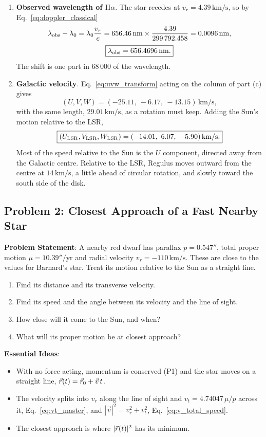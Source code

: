 \begin{enumerate}[label=(\alph*)]
	\item \textbf{Observed wavelength of $\mathrm{H}\alpha$}. The star recedes at $v_r = 4.39\,\mathrm{km/s}$, so by Eq.~\eqref{eq:doppler_classical}
	\[
	\lambda_{\rm obs}-\lambda_0 = \lambda_0\frac{v_r}{c} = 656.46\,\mathrm{nm} \times \frac{4.39}{299\,792.458} = 0.0096\,\mathrm{nm},
	\]
	\[
	\boxed{\lambda_{\rm obs} = 656.4696\,\mathrm{nm}.}
	\]
	The shift is one part in $68\,000$ of the wavelength.

	\item \textbf{Galactic velocity}. Eq.~\eqref{eq:uvw_transform} acting on the column of part (c) gives
	\[
	\boxed{(U,V,W) = (-25.11,\ -6.17,\ -13.15)\,\mathrm{km/s},}
	\]
	with the same length, $29.01\,\mathrm{km/s}$, as a rotation must keep. Adding the Sun's motion relative to the LSR,
	\[
	\boxed{(U_{\rm LSR},V_{\rm LSR},W_{\rm LSR}) = (-14.01,\ 6.07,\ -5.90)\,\mathrm{km/s}.}
	\]
	Most of the speed relative to the Sun is the $U$ component, directed away from the Galactic centre. Relative to the LSR, Regulus moves outward from the centre at $14\,\mathrm{km/s}$, a little ahead of circular rotation, and slowly toward the south side of the disk.
\end{enumerate}

\subsection{Problem 2: Closest Approach of a Fast Nearby Star}
\label{as:prob:closest_approach}

\textbf{Problem Statement}: A nearby red dwarf has parallax $p = 0.547''$, total proper motion $\mu = 10.39''/\mathrm{yr}$ and radial velocity $v_r = -110\,\mathrm{km/s}$. These are close to the values for Barnard's star. Treat its motion relative to the Sun as a straight line.
\begin{enumerate}[label=(\alph*)]
	\item Find its distance and its transverse velocity.
	\item Find its speed and the angle between its velocity and the line of sight.
	\item How close will it come to the Sun, and when?
	\item What will its proper motion be at closest approach?
\end{enumerate}

\textbf{Essential Ideas}:
\begin{itemize}
	\item With no force acting, momentum is conserved (P1) and the star moves on a straight line, $\vec r(t)=\vec r_0+\vec v\,t$.
	\item The velocity splits into $v_r$ along the line of sight and $v_t = 4.74047\,\mu/p$ across it, Eq.~\eqref{eq:vt_master}, and $|\vec v|^2=v_r^2+v_t^2$, Eq.~\eqref{eq:v_total_speed}.
	\item The closest approach is where $|\vec r(t)|^2$ has its minimum.
\end{itemize}

